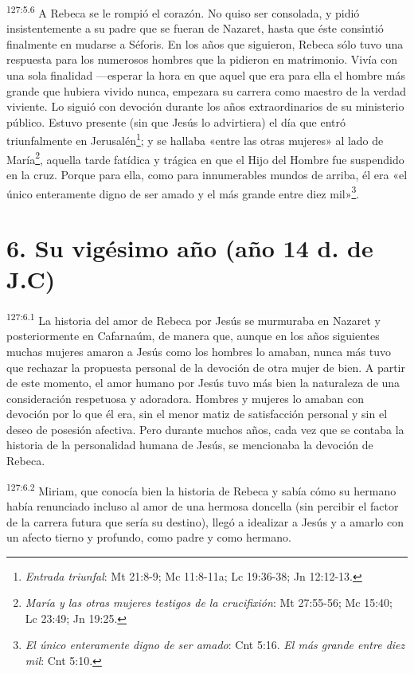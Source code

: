 \par 
\textsuperscript{127:5.6} A Rebeca se le rompió el corazón. No quiso ser consolada, y pidió insistentemente a su padre que se fueran de Nazaret, hasta que éste consintió finalmente en mudarse a Séforis. En los años que siguieron, Rebeca sólo tuvo una respuesta para los numerosos hombres que la pidieron en matrimonio. Vivía con una sola finalidad ---esperar la hora en que aquel que era para ella el hombre más grande que hubiera vivido nunca, empezara su carrera como maestro de la verdad viviente. Lo siguió con devoción durante los años extraordinarios de su ministerio público. Estuvo presente (sin que Jesús lo advirtiera) el día que entró triunfalmente en Jerusalén\footnote{\textit{Entrada triunfal}: Mt 21:8-9; Mc 11:8-11a; Lc 19:36-38; Jn 12:12-13.}; y se hallaba «entre las otras mujeres» al lado de María\footnote{\textit{María y las otras mujeres testigos de la crucifixión}: Mt 27:55-56; Mc 15:40; Lc 23:49; Jn 19:25.}, aquella tarde fatídica y trágica en que el Hijo del Hombre fue suspendido en la cruz. Porque para ella, como para innumerables mundos de arriba, él era «el único enteramente digno de ser amado y el más grande entre diez mil»\footnote{\textit{El único enteramente digno de ser amado}: Cnt 5:16. \textit{El más grande entre diez mil}: Cnt 5:10.}.

\section*{6. Su vigésimo año (año 14 d. de J.C)}
\par 
\textsuperscript{127:6.1} La historia del amor de Rebeca por Jesús se murmuraba en Nazaret y posteriormente en Cafarnaúm, de manera que, aunque en los años siguientes muchas mujeres amaron a Jesús como los hombres lo amaban, nunca más tuvo que rechazar la propuesta personal de la devoción de otra mujer de bien. A partir de este momento, el amor humano por Jesús tuvo más bien la naturaleza de una consideración respetuosa y adoradora. Hombres y mujeres lo amaban con devoción por lo que él era, sin el menor matiz de satisfacción personal y sin el deseo de posesión afectiva. Pero durante muchos años, cada vez que se contaba la historia de la personalidad humana de Jesús, se mencionaba la devoción de Rebeca.

\par 
\textsuperscript{127:6.2} Miriam, que conocía bien la historia de Rebeca y sabía cómo su hermano había renunciado incluso al amor de una hermosa doncella (sin percibir el factor de la carrera futura que sería su destino), llegó a idealizar a Jesús y a amarlo con un afecto tierno y profundo, como padre y como hermano.

